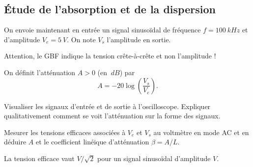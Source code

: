  \subsection{Étude de  l’absorption et de la dispersion}
 On envoie maintenant en entrée un signal sinusoïdal de fréquence $f=\SI{100}{kHz}$ et d’amplitude $V_e = \SI{5}{V}$. On note $V_s$ l’amplitude en sortie.
 \begin{danger}

   Attention, le GBF indique la tension crête-à-crête et non l’amplitude !
 \end{danger}

 \label{sec:att}
 On définit l'atténuation $A>0$ (en $\SI{}{dB}$) par
 \begin{equation}
 A = -20 \log\left( \frac{V_s}{V_e}\right).
 \end{equation}


 \begin{protocole}
 \item Visualiser les signaux d’entrée et de sortie à l’oscilloscope. Expliquer qualitativement comment se voit l'atténuation sur la forme des signaux.

 \item Mesurer les tensions efficaces associées à $V_e$ et $V_s$ au voltmètre en mode AC et en déduire $A$ et le coefficient linéique d'atténuation $\beta=A/L$.

 \begin{danger}
 La tension efficace vaut $V/\sqrt{2}$ pour un signal sinusoïdal d’amplitude $V$.
 \end{danger}



 \end{protocole}


